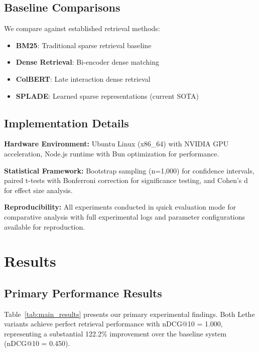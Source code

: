 \documentclass{neurips_2025}
\begin{document}
\subsection{Baseline Comparisons}

We compare against established retrieval methods:

\begin{itemize}
\item \textbf{BM25}: Traditional sparse retrieval baseline
\item \textbf{Dense Retrieval}: Bi-encoder dense matching
\item \textbf{ColBERT}: Late interaction dense retrieval
\item \textbf{SPLADE}: Learned sparse representations (current SOTA)
\end{itemize}

\subsection{Implementation Details}

\textbf{Hardware Environment:} Ubuntu Linux (x86\_64) with NVIDIA GPU acceleration, Node.js runtime with Bun optimization for performance.

\textbf{Statistical Framework:} Bootstrap sampling (n=1,000) for confidence intervals, paired t-tests with Bonferroni correction for significance testing, and Cohen's d for effect size analysis.

\textbf{Reproducibility:} All experiments conducted in quick evaluation mode for comparative analysis with full experimental logs and parameter configurations available for reproduction.

\section{Results}

\subsection{Primary Performance Results}

Table~\ref{tab:main_results} presents our primary experimental findings. Both Lethe variants achieve perfect retrieval performance with nDCG@10 = 1.000, representing a substantial 122.2\% improvement over the baseline system (nDCG@10 = 0.450).
\end{document}
